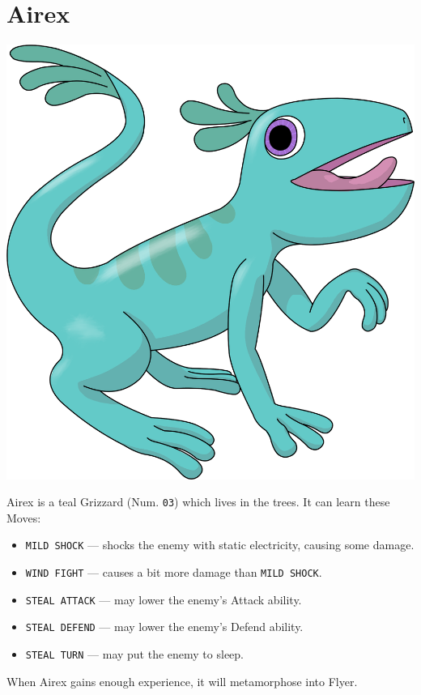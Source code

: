 \documentclass[9pt,twocolumn,openany,article]{memoir}
\newenvironment{ritemize}{\begin{itemize}\raggedright}{\end{itemize}}
\begin{document}
\ifdefined\DEMO\else

\section{Airex}

\begin{center}
  \includegraphics[width=.8\columnwidth]{../Manual/Airex.png}
\end{center}

\noindent{}Airex is  a teal Grizzard  (Num. \texttt{03}) which  lives in
the trees. It can learn these Moves:

\begin{ritemize}
\item \texttt{MILD SHOCK} --- shocks  the enemy with static electricity,
  causing some damage.
\item \texttt{WIND FIGHT} --- causes a bit more damage than \texttt{MILD SHOCK}.
\item \texttt{STEAL ATTACK} --- may lower the enemy's Attack ability.
\item \texttt{STEAL DEFEND} --- may lower the enemy's Defend ability.
\item \texttt{STEAL TURN} --- may put the enemy to sleep.
\end{ritemize}

When Airex gains enough experience, it will metamorphose into Flyer.

\fi

\end{document}
